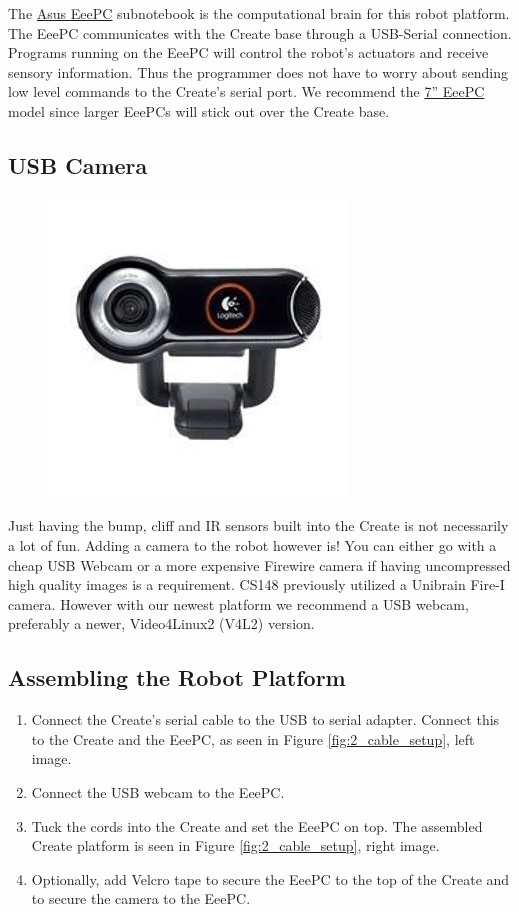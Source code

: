 The \href{eeepc.asus.com/}{Asus EeePC} subnotebook is the computational brain for this robot platform.  The EeePC communicates with the Create base through a USB-Serial connection. Programs running on the EeePC will control the robot's actuators and receive sensory information. Thus the programmer does not have to worry about sending low level commands to the Create's serial port.  We recommend the \href{http://www.asus.com/index.aspx}{7'' EeePC} model since larger EeePCs will stick out over the Create base.

\subsection{USB Camera}

\begin{figure}
\includegraphics[width=0.2\columnwidth]{figures/2_webcam.jpg}
\end{figure}

Just having the bump, cliff and IR sensors built into the Create is not necessarily a lot of fun. Adding a camera to the robot however is! You can either go with a cheap USB Webcam or a more expensive Firewire camera if having uncompressed high quality images is a requirement. CS148 previously utilized a Unibrain Fire-I camera. However with our newest platform we recommend a USB webcam, preferably a newer, Video4Linux2 (V4L2) version.

\subsection{Assembling the Robot Platform}
\label{sec:assembling_the_robot_platform}

\begin{enumerate}
\item Connect the Create's serial cable to the USB to serial adapter. Connect this to the Create and the EeePC, as seen in Figure \ref{fig:2_cable_setup}, left image.
\item Connect the USB webcam to the EeePC.
\item Tuck the cords into the Create and set the EeePC on top. The assembled Create platform is seen in Figure \ref{fig:2_cable_setup}, right image.
\item Optionally, add Velcro tape to secure the EeePC to the top of the Create and to secure the camera to the EeePC.
\end{enumerate}


